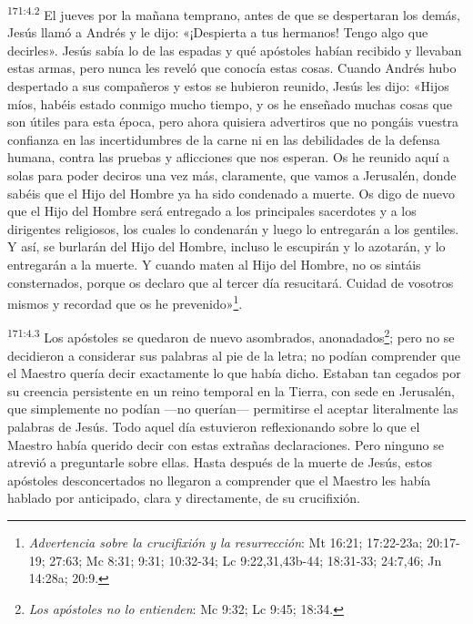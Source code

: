 \par
\textsuperscript{171:4.2} El jueves por la mañana temprano, antes de que se despertaran los demás, Jesús llamó a Andrés y le dijo: «¡Despierta a tus hermanos! Tengo algo que decirles». Jesús sabía lo de las espadas y qué apóstoles habían recibido y llevaban estas armas, pero nunca les reveló que conocía estas cosas. Cuando Andrés hubo despertado a sus compañeros y estos se hubieron reunido, Jesús les dijo: «Hijos míos, habéis estado conmigo mucho tiempo, y os he enseñado muchas cosas que son útiles para esta época, pero ahora quisiera advertiros que no pongáis vuestra confianza en las incertidumbres de la carne ni en las debilidades de la defensa humana, contra las pruebas y aflicciones que nos esperan. Os he reunido aquí a solas para poder deciros una vez más, claramente, que vamos a Jerusalén, donde sabéis que el Hijo del Hombre ya ha sido condenado a muerte. Os digo de nuevo que el Hijo del Hombre será entregado a los principales sacerdotes y a los dirigentes religiosos, los cuales lo condenarán y luego lo entregarán a los gentiles. Y así, se burlarán del Hijo del Hombre, incluso le escupirán y lo azotarán, y lo entregarán a la muerte. Y cuando maten al Hijo del Hombre, no os sintáis consternados, porque os declaro que al tercer día resucitará. Cuidad de vosotros mismos y recordad que os he prevenido»\footnote{\textit{Advertencia sobre la crucifixión y la resurrección}: Mt 16:21; 17:22-23a; 20:17-19; 27:63; Mc 8:31; 9:31; 10:32-34; Lc 9:22,31,43b-44; 18:31-33; 24:7,46; Jn 14:28a; 20:9.}.

\par
\textsuperscript{171:4.3} Los apóstoles se quedaron de nuevo asombrados, anonadados\footnote{\textit{Los apóstoles no lo entienden}: Mc 9:32; Lc 9:45; 18:34.}; pero no se decidieron a considerar sus palabras al pie de la letra; no podían comprender que el Maestro quería decir exactamente lo que había dicho. Estaban tan cegados por su creencia persistente en un reino temporal en la Tierra, con sede en Jerusalén, que simplemente no podían ---no querían--- permitirse el aceptar literalmente las palabras de Jesús. Todo aquel día estuvieron reflexionando sobre lo que el Maestro había querido decir con estas extrañas declaraciones. Pero ninguno se atrevió a preguntarle sobre ellas. Hasta después de la muerte de Jesús, estos apóstoles desconcertados no llegaron a comprender que el Maestro les había hablado por anticipado, clara y directamente, de su crucifixión.

